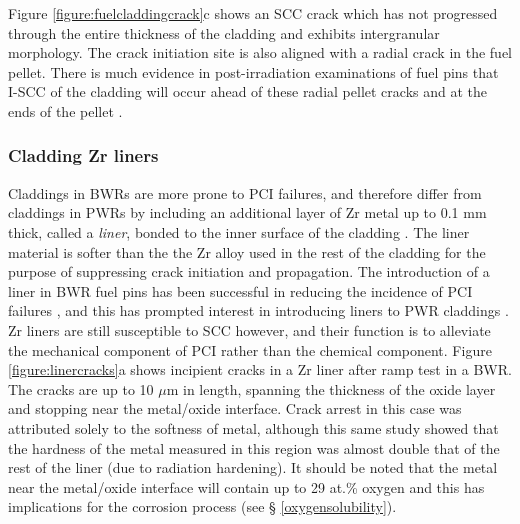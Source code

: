 Figure \ref{figure:fuelcladdingcrack}c shows an SCC crack which has not progressed through the entire thickness of the cladding and exhibits intergranular morphology. The crack initiation site is also aligned with a radial crack in the fuel pellet. There is much evidence in post-irradiation examinations of fuel pins that I-SCC of the cladding will occur ahead of these radial pellet cracks and at the ends of the pellet \cite{Peehs2009, Haddad1983, haynes2015modelling, Wood1975, Nobrega1985, Syrett1981, Shimada1983}.

\subsubsection{Cladding Zr liners}

Claddings in BWRs are more prone to PCI failures, and therefore differ from claddings in PWRs by including an additional layer of Zr metal up to 0.1 mm thick, called a \emph{liner}, bonded to the inner surface of the cladding \cite{Kitano2006, Takagi1996}. The liner material is softer than the the Zr alloy used in the rest of the cladding for the purpose of suppressing crack initiation and propagation. The introduction of a liner in BWR fuel pins has been successful in reducing the incidence of PCI failures \cite{andersson2003fuel, klinger2003experience}, and this has prompted interest in introducing liners to PWR claddings \cite{groeschel2003failure}. Zr liners are still susceptible to SCC however, and their function is to alleviate the mechanical component of PCI rather than the chemical component. Figure \ref{figure:linercracks}a shows incipient cracks in a Zr liner after ramp test in a BWR. The cracks are up to 10 $\mu$m in length, spanning the thickness of the oxide layer and stopping near the metal/oxide interface. Crack arrest in this case was attributed solely to the softness of metal, although this same study showed that the hardness of the metal measured in this region was almost double that of the rest of the liner (due to radiation hardening). It should be noted that the metal near the metal/oxide interface will contain up to 29 at.\% oxygen and this has implications for the corrosion process (see § \ref{oxygensolubility}).

